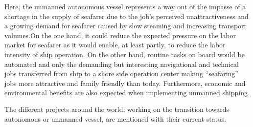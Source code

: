 Here, the unmanned autonomous vessel represents a way out of the impasse of a shortage in the supply of seafarer due to the job’s perceived unattractiveness and a growing demand for seafarer caused by slow steaming and increasing transport volumes.On the one hand, it could reduce the expected pressure on the labor market for seafarer as it would enable, at least partly, to reduce the labor intensity of ship operation. On the other hand, routine tasks on board would be automated and only the demanding but interesting navigational and technical jobs transferred from ship to a shore side operation center making “seafaring” jobs more attractive and family friendly than today. Furthermore, economic and environmental benefits are also expected when implementing unmanned shipping. \cite{MUNIN2016}

The different projects around the world, working on the transition towards autonomous or unmanned vessel, are mentioned with their current status.


